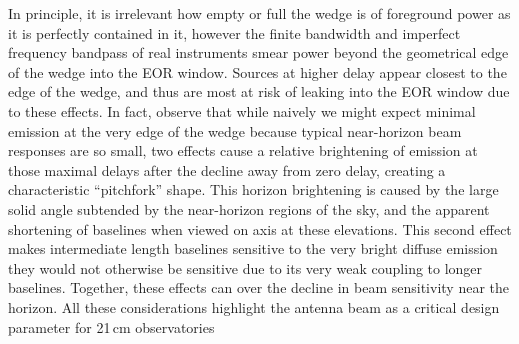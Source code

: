 \documentclass[preprint]{aastex}
\begin{document}

In principle, it is irrelevant how empty or full the wedge is of foreground power as it is 
perfectly contained in it, however the finite bandwidth and imperfect frequency bandpass 
of real instruments smear power beyond the geometrical edge of the wedge into the EOR 
window. Sources at higher delay appear closest to the edge of the wedge, and thus are 
most at risk of leaking into the EOR window due to these effects. In fact, 
\citet{nithya15,nithya15b} observe that while naively we might expect minimal emission 
at the very edge of the wedge because typical near-horizon beam responses are so small, 
two effects cause a relative brightening of emission at those maximal delays after the 
decline away from zero delay, creating a characteristic ``pitchfork'' shape. This horizon 
brightening is caused by the large solid angle subtended by the near-horizon regions of the 
sky, and the apparent shortening of baselines when viewed on axis at these elevations. 
This second effect makes intermediate length baselines sensitive to the very bright diffuse 
emission they would not otherwise be sensitive due to its very weak coupling to longer 
baselines. Together, these effects can over the decline in beam sensitivity near the horizon. 
All these considerations highlight the antenna beam as a critical design parameter for 
21\,cm observatories
\end{document}
